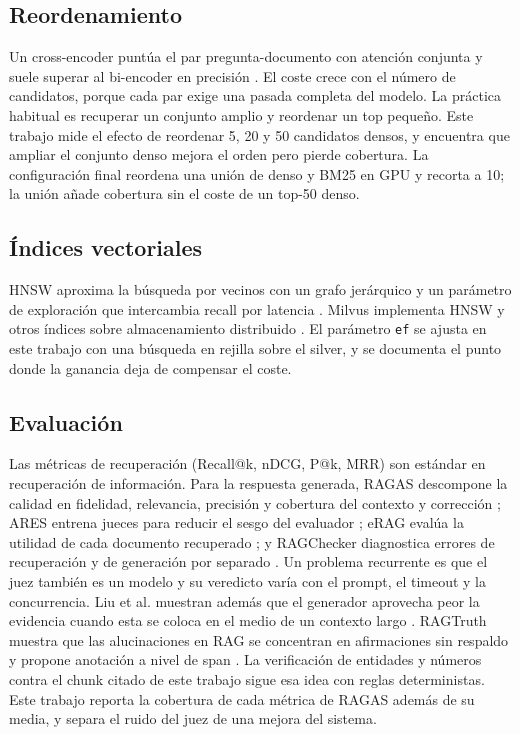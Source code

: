 \subsection{Reordenamiento}

Un cross-encoder punt\'ua el par pregunta-documento con atenci\'on conjunta y suele superar al bi-encoder en precisi\'on \cite{nogueira2019passage}. El coste crece con el n\'umero de candidatos, porque cada par exige una pasada completa del modelo. La pr\'actica habitual es recuperar un conjunto amplio y reordenar un top peque\~no. Este trabajo mide el efecto de reordenar 5, 20 y 50 candidatos densos, y encuentra que ampliar el conjunto denso mejora el orden pero pierde cobertura. La configuraci\'on final reordena una uni\'on de denso y BM25 en GPU y recorta a 10; la uni\'on a\~nade cobertura sin el coste de un top-50 denso.

\subsection{\'Indices vectoriales}

HNSW aproxima la b\'usqueda por vecinos con un grafo jer\'arquico y un par\'ametro de exploraci\'on que intercambia recall por latencia \cite{malkov2020hnsw}. Milvus implementa HNSW y otros \'indices sobre almacenamiento distribuido \cite{milvusdocs}. El par\'ametro \texttt{ef} se ajusta en este trabajo con una b\'usqueda en rejilla sobre el silver, y se documenta el punto donde la ganancia deja de compensar el coste.

\subsection{Evaluaci\'on}

Las m\'etricas de recuperaci\'on (Recall@k, nDCG, P@k, MRR) son est\'andar en recuperaci\'on de informaci\'on. Para la respuesta generada, RAGAS descompone la calidad en fidelidad, relevancia, precisi\'on y cobertura del contexto y correcci\'on \cite{es2023ragas}; ARES entrena jueces para reducir el sesgo del evaluador \cite{saadfalcon2024ares}; eRAG eval\'ua la utilidad de cada documento recuperado \cite{salemi2024erag}; y RAGChecker diagnostica errores de recuperaci\'on y de generaci\'on por separado \cite{ru2024ragchecker}. Un problema recurrente es que el juez tambi\'en es un modelo y su veredicto var\'ia con el prompt, el timeout y la concurrencia. Liu et al. muestran adem\'as que el generador aprovecha peor la evidencia cuando esta se coloca en el medio de un contexto largo \cite{liu2024lost}. RAGTruth muestra que las alucinaciones en RAG se concentran en afirmaciones sin respaldo y propone anotaci\'on a nivel de span \cite{niu2024ragtruth}. La verificaci\'on de entidades y n\'umeros contra el chunk citado de este trabajo sigue esa idea con reglas deterministas. Este trabajo reporta la cobertura de cada m\'etrica de RAGAS adem\'as de su media, y separa el ruido del juez de una mejora del sistema.

